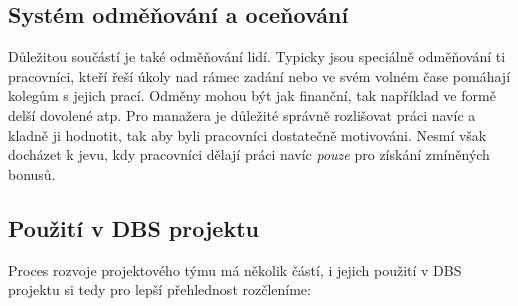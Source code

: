 \subsection{Systém odměňování a oceňování}
Důležitou součástí je také odměňování lidí. Typicky jsou speciálně odměňování ti pracovníci, kteří řeší úkoly nad rámec zadání nebo ve svém volném čase pomáhají kolegům s jejich prací. Odměny mohou být jak finanční, tak například ve formě delší dovolené atp. Pro manažera je důležité správně rozlišovat práci navíc a kladně ji hodnotit, tak aby byli pracovníci dostatečně motivováni. Nesmí však docházet k jevu, kdy pracovníci dělají práci navíc \emph{pouze} pro získání zmíněných bonusů.

\subsection{Použití v DBS projektu}
Proces rozvoje projektového týmu má několik částí, i jejich použití v DBS projektu si tedy pro lepší přehlednost rozčleníme:

